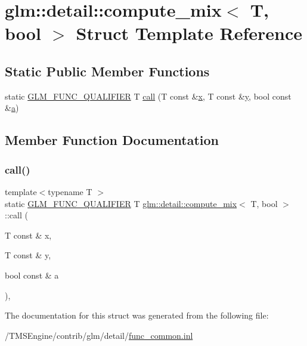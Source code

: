 \hypertarget{structglm_1_1detail_1_1compute__mix_3_01_t_00_01bool_01_4}{}\section{glm\+:\+:detail\+:\+:compute\+\_\+mix$<$ T, bool $>$ Struct Template Reference}
\label{structglm_1_1detail_1_1compute__mix_3_01_t_00_01bool_01_4}
\subsection*{Static Public Member Functions}
\begin{DoxyCompactItemize}
\item 
static \hyperlink{setup_8hpp_a33fdea6f91c5f834105f7415e2a64407}{G\+L\+M\+\_\+\+F\+U\+N\+C\+\_\+\+Q\+U\+A\+L\+I\+F\+I\+ER} T \hyperlink{structglm_1_1detail_1_1compute__mix_3_01_t_00_01bool_01_4_a7a83cf7bd102239b974faf18137d8c63}{call} (T const \&\hyperlink{_s_d_l__opengl_8h_ad0e63d0edcdbd3d79554076bf309fd47}{x}, T const \&\hyperlink{_s_d_l__opengl_8h_a1675d9d7bb68e1657ff028643b4037e3}{y}, bool const \&\hyperlink{_s_d_l__opengl__glext_8h_a3309789fc188587d666cda5ece79cf82}{a})
\end{DoxyCompactItemize}


\subsection{Member Function Documentation}
\mbox{\label{structglm_1_1detail_1_1compute__mix_3_01_t_00_01bool_01_4_a7a83cf7bd102239b974faf18137d8c63}} 
\subsubsection{\texorpdfstring{call()}{call()}}
{\footnotesize\ttfamily template$<$typename T $>$ \\
static \hyperlink{setup_8hpp_a33fdea6f91c5f834105f7415e2a64407}{G\+L\+M\+\_\+\+F\+U\+N\+C\+\_\+\+Q\+U\+A\+L\+I\+F\+I\+ER} T \hyperlink{structglm_1_1detail_1_1compute__mix}{glm\+::detail\+::compute\+\_\+mix}$<$ T, bool $>$\+::call (\begin{DoxyParamCaption}\item[{T const \&}]{x,  }\item[{T const \&}]{y,  }\item[{bool const \&}]{a }\end{DoxyParamCaption})\hspace{0.3cm}{\ttfamily [inline]}, {\ttfamily [static]}}



The documentation for this struct was generated from the following file\+:\begin{DoxyCompactItemize}
\item 
/\+T\+M\+S\+Engine/contrib/glm/detail/\hyperlink{func__common_8inl}{func\+\_\+common.\+inl}\end{DoxyCompactItemize}
